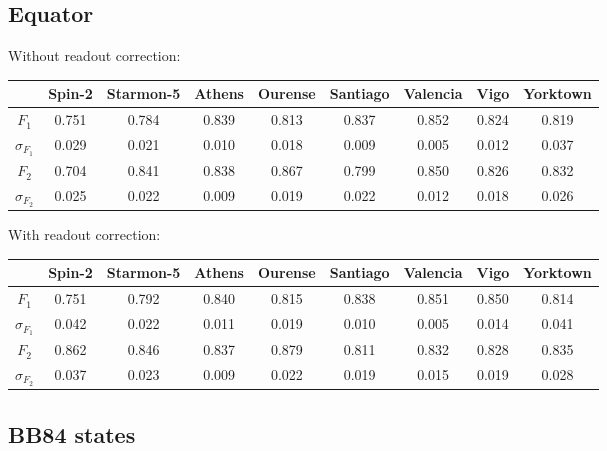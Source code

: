 \subsection{Equator}

Without readout correction:
\begin{table}[H]
    \centering
    \begin{tabular}{|c|c|c|c|c|c|c|c|c|}
    \hline
    \textbf{} & \textbf{Spin-2} & \textbf{Starmon-5} & \textbf{Athens} & \textbf{Ourense} & \textbf{Santiago} & \textbf{Valencia} & \textbf{Vigo} & \textbf{Yorktown} \\ \hline
    $F_1$              & 0.751  & 0.784 & 0.839 & 0.813 & 0.837 & 0.852 & 0.824 & 0.819 \\ \hline
    $\sigma_{F_1}$     & 0.029  & 0.021 & 0.010 & 0.018 & 0.009 & 0.005 & 0.012 & 0.037 \\ \hline
    $F_2$              & 0.704  & 0.841 & 0.838 & 0.867 & 0.799 & 0.850 & 0.826 & 0.832 \\ \hline
    $\sigma_{F_2}$     & 0.025  & 0.022 & 0.009 & 0.019 & 0.022 & 0.012 & 0.018 & 0.026 \\ \hline
    \end{tabular}
\end{table}

With readout correction:
\begin{table}[H]
    \centering
    \begin{tabular}{|c|c|c|c|c|c|c|c|c|}
    \hline
    \textbf{} & \textbf{Spin-2} & \textbf{Starmon-5} & \textbf{Athens} & \textbf{Ourense} & \textbf{Santiago} & \textbf{Valencia} & \textbf{Vigo} & \textbf{Yorktown} \\ \hline
    $F_1$              & 0.751 & 0.792 & 0.840 & 0.815 & 0.838 & 0.851 & 0.850 & 0.814 \\ \hline
    $\sigma_{F_1}$     & 0.042 & 0.022 & 0.011 & 0.019 & 0.010 & 0.005 & 0.014 & 0.041 \\ \hline
    $F_2$              & 0.862 & 0.846 & 0.837 & 0.879 & 0.811 & 0.832 & 0.828 & 0.835 \\ \hline
    $\sigma_{F_2}$     & 0.037 & 0.023 & 0.009 & 0.022 & 0.019 & 0.015 & 0.019 & 0.028 \\ \hline
    \end{tabular}
\end{table}

\subsection{BB84 states}

